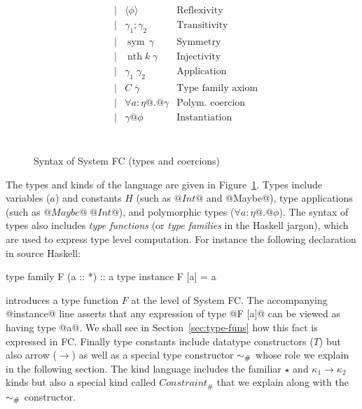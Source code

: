\documentclass[a4paper,UKenglish]{lipics}
\makeatletter
\newcommand{\psim}{\mathrel{\sim_{\tiny \#}}}
\newcommand{\static}{\textsf{$Constraint_{\#}$}}
\newcommand{\ol}[1]{\overline{#1}}
\newcommand{\sym}[1]{\mathop{sym}\, #1}
\newcommand{\nth}[2]{\mathop{nth} #1\;#2}
\newcommand{\inst}[2]{#1@#2}
\newcommand{\refl}[1]{\langle#1\rangle}  %
\newcommand{\gammas}{\ol{\gamma}}
\makeatother
\begin{document}
\begin{figure}
\[\begin{array}{l|l}
\begin{array}{lrll}
  & \mid    & \refl{\phi}             & \text{Reflexivity} \\ 
  & \mid    & \gamma_1;\gamma_2        & \text{Transitivity} \\ 
  & \mid    & \sym{\gamma}        & \text{Symmetry} \\ 
  & \mid    & \nth{k}{\gamma}     & \text{Injectivity} \\ 
  & \mid    & \gamma_1\;\gamma_2       & \text{Application} \\
  & \mid    & C\;\gammas          & \text{Type family axiom} \\ 
  & \mid    & \forall a{:}\eta @.@ \gamma   & \text{Polym. coercion} \\
  & \mid    & \inst{\gamma}{\phi}    & \text{Instantiation} \\ \\ \\ \\
\end{array} 
\end{array}\]
\caption{Syntax of System FC (types and coercions)}\label{fig:syntax2}
\end{figure}

The types and kinds of the language are given in Figure~\ref{fig:syntax2}. Types include variables ($a$)
and constants $H$ (such as $@Int@$ and @Maybe@), type applications (such as $@Maybe@\;@Int@$), 
and polymorphic types ($\forall a{:}\eta @.@ \phi$). The syntax of types also includes {\em type functions}
(or {\em type families} in the Haskell jargon), which are used to express type level computation.
For instance the following declaration in source Haskell:
\begin{code}
  type family F (a :: *) :: a
  type instance F [a] = a
\end{code}
introduces a type function $F$ at the level of System FC. The accompanying @instance@ line asserts
that any expression of type @F [a]@ can be viewed as having type @a@. We shall see in 
Section~\ref{sec:type-funs} how this fact 
is expressed in FC. Finally type constants include datatype 
constructors ($T$) but also arrow ($\to$) as well as a special type constructor $\psim$ whose 
role we explain in the following section. The kind language includes the familiar $\star$ and
$\kappa_1 \to \kappa_2$ kinds but also a special kind called $\static$ that we explain along with
the $\psim$ constructor.
\end{document}
